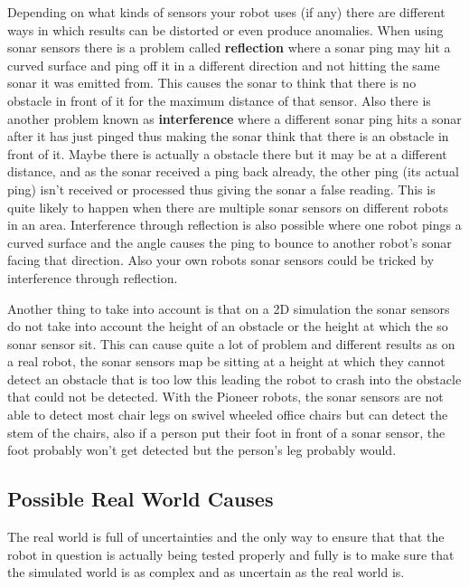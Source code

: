 \documentclass[a4paper,12pt]{article}
\begin{document}
\noindent Depending on what kinds of sensors your robot uses (if any) there are different ways in which results can be distorted or even produce anomalies. When using sonar sensors there is a problem called \textbf{reflection} where a sonar ping may hit a curved surface and ping off it in a different direction and not hitting the same sonar it was emitted from. This causes the sonar to think that there is no obstacle in front of it for the maximum distance of that sensor. Also there is another problem known as \textbf{interference} where a different sonar ping hits a sonar after it has just pinged thus making the sonar think that there is an obstacle in front of it. Maybe there is actually a obstacle there but it may be at a different distance, and as the sonar received a ping back already, the other ping (its actual ping) isn't received or processed thus giving the sonar a false reading. This is quite likely to happen when there are multiple sonar sensors on different robots in an area. Interference through reflection is also possible where one robot pings a curved surface and the angle causes the ping to bounce to another robot's sonar facing that direction. Also your own robots sonar sensors could be tricked by interference through reflection.

\vspace{5mm}
\noindent Another thing to take into account is that on a 2D simulation the sonar sensors do not take into account the height of an obstacle or the height at which the so sonar sensor sit. This can cause quite a lot of problem and different results as on a real robot, the sonar sensors map be sitting at a height at which they cannot detect an obstacle that is too low this leading the robot to crash into the obstacle that could not be detected. With the Pioneer robots, the sonar sensors are not able to detect most chair legs on swivel wheeled office chairs but can detect the stem of the chairs, also if a person put their foot in front of a sonar sensor, the foot probably won't get detected but the person's leg probably would.

\subsection{Possible Real World Causes}

\noindent The real world is full of uncertainties and the only way to ensure that that the robot in question is actually being tested properly and fully is to make sure that the simulated world is as complex and as uncertain as the real world is.
\end{document}
